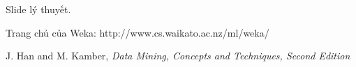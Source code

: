 \cleardoublepage
{}
{}
\begin{thebibliography}{99}

Slide lý thuyết.

Trang chủ của Weka: http://www.cs.waikato.ac.nz/ml/weka/

J. Han and M. Kamber, \textit{Data Mining, Concepts and Techniques, Second Edition}
\end{thebibliography}